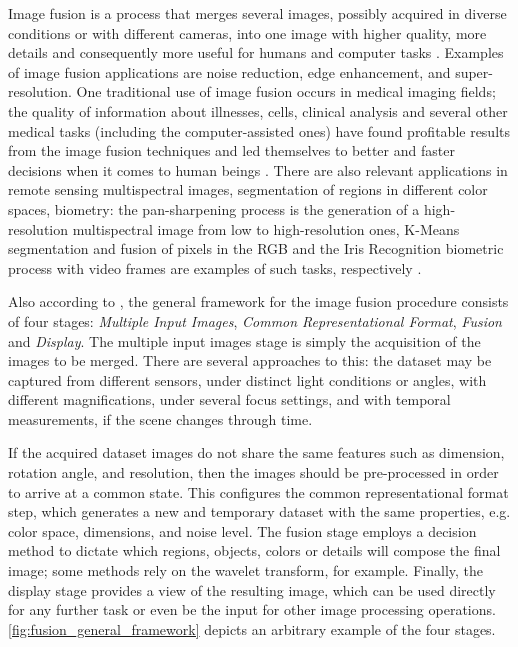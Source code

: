 Image fusion is a process that merges several images, possibly acquired in diverse conditions or with different cameras, into one image with higher quality, more details and consequently more useful for humans and computer tasks \cite{mitchell2010image}. Examples of image fusion applications are noise reduction, edge enhancement, and super-resolution. One traditional use of image fusion occurs in medical imaging fields; the quality of information about illnesses, cells, clinical analysis and several other medical tasks (including the computer-assisted ones) have found profitable results from the image fusion techniques and led themselves to better and faster decisions when it comes to human beings \cite{james2014medical}. There are also relevant applications in remote sensing multispectral images, segmentation of regions in different color spaces, biometry: the pan-sharpening process is the generation of a high-resolution multispectral image from low to high-resolution ones, K-Means segmentation and fusion of pixels in the RGB and the Iris Recognition biometric process with video frames are examples of such tasks, respectively \cite{mitchell2010image}.


Also according to , the general framework for the image fusion procedure consists of four stages: \emph{Multiple Input Images}, \emph{Common Representational Format}, \emph{Fusion} and \emph{Display}.
The multiple input images stage is simply the acquisition of the images to be merged. There are several approaches to this: the dataset may be captured from different sensors, under distinct light conditions or angles, with different magnifications, under several focus settings, and with temporal measurements, if the scene changes through time.

If the acquired dataset images do not share the same features such as dimension, rotation angle, and resolution, then the images should be pre-processed in order to arrive at a common state. This configures the common representational format step, which generates a new and temporary dataset with the same properties, e.g. color space, dimensions, and noise level. The fusion stage employs a decision method to dictate which regions, objects, colors or details will compose the final image; some methods rely on the wavelet transform, for example. Finally, the display stage provides a view of the resulting image, which can be used directly for any further task or even be the input for other image processing operations. \autoref{fig:fusion_general_framework} depicts an arbitrary example of the four stages. 


